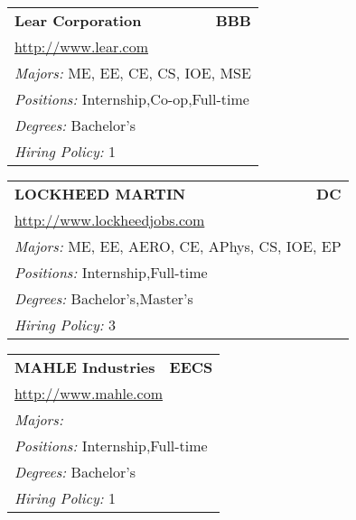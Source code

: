 \documentclass[twoside]{article}
\begin{document}
\begin{center}
\begin{multicols}{3}
\begin{FlushLeft}
\begin{minipage}{.9\columnwidth}
\end{minipage}
 
\begin{minipage}{.9\columnwidth}\begin{tabularx}{.95\columnwidth}{Xr}
                 {\Large\bf Lear Corporation} & {\Large\bf BBB}\\
    \multicolumn{2}{p{.95\columnwidth}}{\url{http://www.lear.com}}\\
    \multicolumn{2}{p{.95\columnwidth}}{\emph{Majors:} ME, EE, CE, CS, IOE, MSE}\\
    \multicolumn{2}{p{.95\columnwidth}}{\emph{Positions:} Internship,Co-op,Full-time}\\
    \multicolumn{2}{p{.95\columnwidth}}{\emph{Degrees:} Bachelor's}\\
    \multicolumn{2}{p{.95\columnwidth}}{\emph{Hiring Policy:} 1}\\
    \end{tabularx}
    
\end{minipage}
 
\begin{minipage}{.9\columnwidth}\begin{tabularx}{.95\columnwidth}{Xr}
                 {\Large\bf LOCKHEED MARTIN} & {\Large\bf DC}\\
    \multicolumn{2}{p{.95\columnwidth}}{\url{http://www.lockheedjobs.com}}\\
    \multicolumn{2}{p{.95\columnwidth}}{\emph{Majors:} ME, EE, AERO, CE, APhys, CS, IOE, EP}\\
    \multicolumn{2}{p{.95\columnwidth}}{\emph{Positions:} Internship,Full-time}\\
    \multicolumn{2}{p{.95\columnwidth}}{\emph{Degrees:} Bachelor's,Master's}\\
    \multicolumn{2}{p{.95\columnwidth}}{\emph{Hiring Policy:} 3}\\
    \end{tabularx}
    
\end{minipage}
 
\begin{minipage}{.9\columnwidth}\begin{tabularx}{.95\columnwidth}{Xr}
                 {\Large\bf MAHLE Industries} & {\Large\bf EECS}\\
    \multicolumn{2}{p{.95\columnwidth}}{\url{http://www.mahle.com}}\\
    \multicolumn{2}{p{.95\columnwidth}}{\emph{Majors:} }\\
    \multicolumn{2}{p{.95\columnwidth}}{\emph{Positions:} Internship,Full-time}\\
    \multicolumn{2}{p{.95\columnwidth}}{\emph{Degrees:} Bachelor's}\\
    \multicolumn{2}{p{.95\columnwidth}}{\emph{Hiring Policy:} 1}\\
    \end{tabularx}
    

\end{minipage}
\end{FlushLeft}
\end{multicols}
\end{center}
\end{document}
